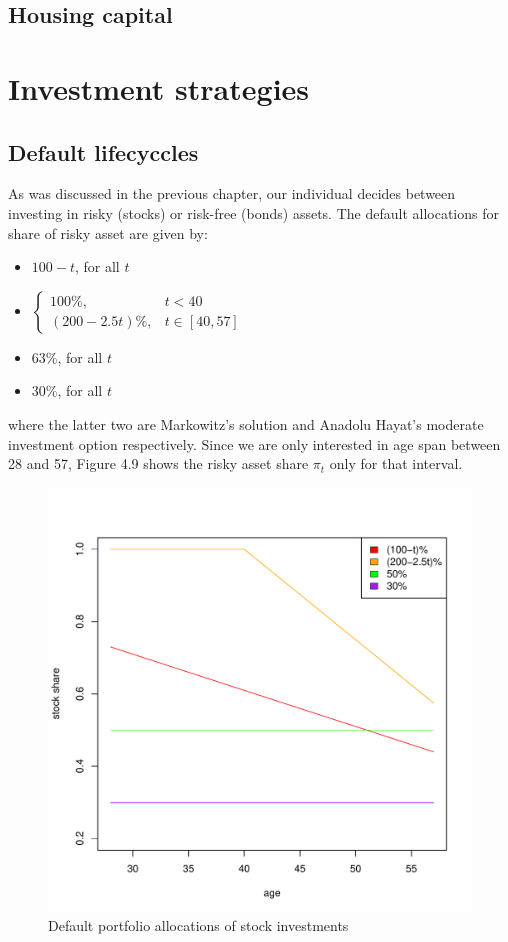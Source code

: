 \subsection{Housing capital}




\section{Investment strategies}
\subsection{Default lifecyccles}
As was discussed in the previous chapter, our individual decides between investing in risky (stocks) or risk-free (bonds) assets. The default allocations for share of risky asset are given by:

\begin{itemize}
	\item $100-t$, for all $t$
	\item $\begin{cases} 100\%, & t<40\\(200-2.5t)\%, & t\in[40,57]\end{cases}$
	\item $63\%$, for all $t$
	\item $30\%$, for all $t$
\end{itemize}

where the latter two are Markowitz's solution and Anadolu Hayat's moderate investment option respectively. Since we are only interested in age span between 28 and 57, Figure 4.9 shows the risky asset share $\pi_t$ only for that interval. 

\begin{figure}[h]
	\centering
	\includegraphics[scale=0.6]{figs/defaults.pdf}
	\caption{Default portfolio allocations of stock investments}
\end{figure}


